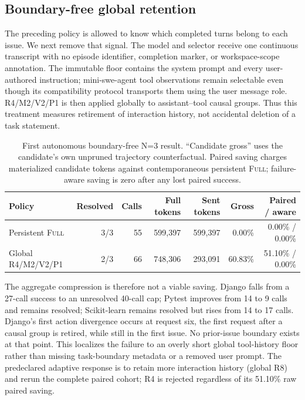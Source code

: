 \documentclass[11pt]{article}
\begin{document}
\subsection{Boundary-free global retention}

The preceding policy is allowed to know which completed turns belong to each
issue.  We next remove that signal.  The model and selector receive one
continuous transcript with no episode identifier, completion marker, or
workspace-scope annotation.  The immutable floor contains the system prompt
and every user-authored instruction; mini-swe-agent tool observations remain
selectable even though its compatibility protocol transports them using the
user message role.  R4/M2/V2/P1 is then applied globally to assistant--tool
causal groups.  Thus this treatment measures retirement of interaction
history, not accidental deletion of a task statement.

\begin{table}[H]
\centering
\small
\caption{First autonomous boundary-free N=3 result.  ``Candidate gross''
uses the candidate's own unpruned trajectory counterfactual.  Paired saving
charges materialized candidate tokens against contemporaneous persistent
\textsc{Full}; failure-aware saving is zero after any lost paired success.}
\label{tab:persistent-global-boundary-free-r4}
\begin{tabular}{lrrrrrr}
\toprule
Policy & Resolved & Calls & Full tokens & Sent tokens & Gross & Paired / aware \\
\midrule
Persistent \textsc{Full} & 3/3 & 55 & 599,397 & 599,397 & 0.00\% & 0.00\% / 0.00\% \\
Global R4/M2/V2/P1 & 2/3 & 66 & 748,306 & 293,091 & 60.83\% & 51.10\% / 0.00\% \\
\bottomrule
\end{tabular}
\end{table}

The aggregate compression is therefore not a viable saving.  Django falls
from a 27-call success to an unresolved 40-call cap; Pytest improves from 14
to 9 calls and remains resolved; Scikit-learn remains resolved but rises from
14 to 17 calls.  Django's first action divergence occurs at request six, the
first request after a causal group is retired, while still in the first issue.
No prior-issue boundary exists at that point.  This localizes the failure to
an overly short global tool-history floor rather than missing task-boundary
metadata or a removed user prompt.  The predeclared adaptive response is to
retain more interaction history (global R8) and rerun the complete paired
cohort; R4 is rejected regardless of its 51.10\% raw paired saving.
\end{document}
